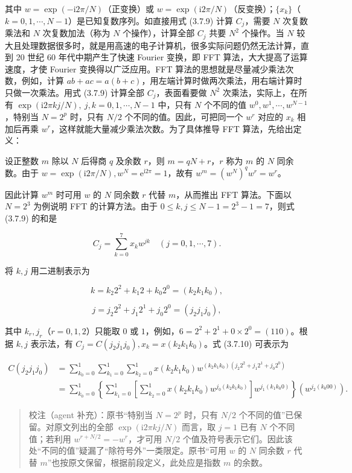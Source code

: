 其中 \(w=\exp(-\mathrm i2\pi/N)\)（正变换）或 \(w=\exp(\mathrm i2\pi/N)\)（反变换）；\(\{x_k\}\)（\(k=0,1,\cdots,N-1\)）是已知复数序列。如直接用式 (3.7.9) 计算 \(C_j\)，需要 \(N\) 次复数乘法和 \(N\) 次复数加法（称为 \(N\) 个操作），计算全部 \(C_j\) 共要 \(N^2\) 个操作。当 \(N\) 较大且处理数据很多时，就是用高速的电子计算机，很多实际问题仍然无法计算，直到 20 世纪 60 年代中期产生了快速 Fourier 变换，即 FFT 算法，大大提高了运算速度，才使 Fourier 变换得以广泛应用。FFT 算法的思想就是尽量减少乘法次数，例如，计算 \(ab+ac=a(b+c)\)，用左端计算时做两次乘法，用右端计算时只做一次乘法。用式 (3.7.9) 计算全部 \(C_j\)，表面看要做 \(N^2\) 次乘法，实际上，在所有 \(\exp(\mathrm i2\pi kj/N),\ j,k=0,1,\cdots,N-1\) 中，只有 \(N\) 个不同的值 \(w^0,w^1,\cdots,w^{N-1}\)，特别当 \(N=2^p\) 时，只有 \(N/2\) 个不同的值。因此，可把同一个 \(w^r\) 对应的 \(x_k\) 相加后再乘 \(w^r\)，这样就能大量减少乘法次数。为了具体推导 FFT 算法，先给出定义：

设正整数 \(m\) 除以 \(N\) 后得商 \(q\) 及余数 \(r\)，则 \(m=qN+r\)，\(r\) 称为 \(m\) 的 \(N\) 同余数。由于 \(w=\exp(\mathrm i2\pi/N),w^N=\mathrm e^{\mathrm i2\pi}=1\)，故有 \(w^m=(w^N)^qw^r=w^r\)。

因此计算 \(w^m\) 时可用 \(w\) 的 \(N\) 同余数 \(r\) 代替 \(m\)，从而推出 FFT 算法。下面以 \(N=2^3\) 为例说明 FFT 的计算方法。由于 \(0\leqslant k,j\leqslant N-1=2^3-1=7\)，则式 (3.7.9) 的和是

\[
C_j=\sum_{k=0}^7x_kw^{jk}\quad(j=0,1,\cdots,7).\tag{3.7.10}
\]

将 \(k,j\) 用二进制表示为

\[
k=k_2 2^2+k_1 2+k_0 2^0=(k_2k_1k_0),
\]

\[
j=j_2 2^2+j_1 2^1+j_0 2^0=(j_2j_1j_0),
\]

其中 \(k_r,j_r\)（\(r=0,1,2\)）只能取 \(0\) 或 \(1\)，例如，\(6=2^2+2^1+0\times2^0=(110)\)。根据 \(k,j\) 表示法，有 \(C_j=C(j_2j_1j_0),x_k=x(k_2k_1k_0)\)。式 (3.7.10) 可表示为

\[
\begin{aligned}
C(j_2j_1j_0)&=\sum_{k_0=0}^1\sum_{k_1=0}^1\sum_{k_2=0}^1x(k_2k_1k_0)w^{(k_2k_1k_0)(j_2 2^2+j_1 2^1+j_0 2^0)}\\
&=\sum_{k_0=0}^1\left\{\sum_{k_1=0}^1\left[\sum_{k_2=0}^1x(k_2k_1k_0)w^{j_0(k_2k_1k_0)}\right]w^{j_1(k_1k_0 0)}\right\}\left(w^{j_2(k_0 00)}\right).
\end{aligned}\tag{3.7.11}
\]

\begin{quote}
校注（agent 补充）：原书``特别当 \(N=2^p\) 时，只有 \(N/2\) 个不同的值''已保留。对原文列出的全部 \(\exp(\mathrm i2\pi kj/N)\) 而言，取 \(j=1\) 已有 \(N\) 个不同值；若利用 \(w^{r+N/2}=-w^r\)，才可用 \(N/2\) 个值及符号表示它们。因此该处``不同的值''疑漏了``除符号外''一类限定。原书``可用 \(w\) 的 \(N\) 同余数 \(r\) 代替 \(m\)''也按原文保留，根据前段定义，此处应是指数 \(m\) 的余数。
\end{quote}


